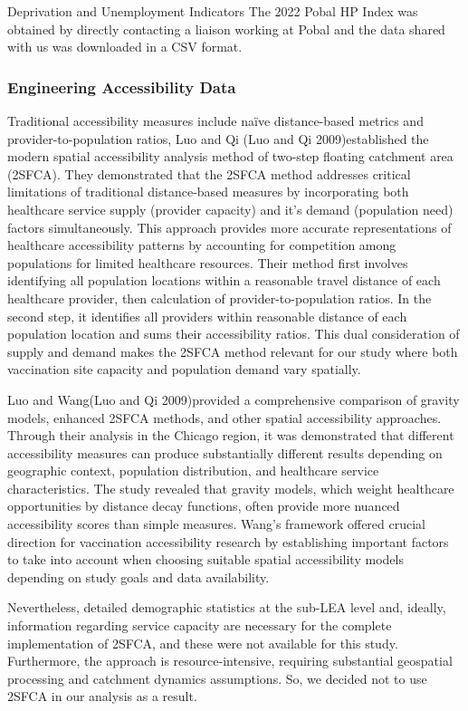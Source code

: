 \documentclass{article}
\begin{document}
Deprivation and Unemployment Indicators The 2022 Pobal HP Index was
obtained by directly contacting a liaison working at Pobal and the data
shared with us was downloaded in a CSV format.

\subsubsection{Engineering Accessibility
Data}\label{engineering-accessibility-data}

Traditional accessibility measures include naïve distance-based metrics
and provider-to-population ratios, Luo and Qi (Luo and Qi
2009)established the modern spatial accessibility analysis method of
two-step floating catchment area (2SFCA). They demonstrated that the
2SFCA method addresses critical limitations of traditional
distance-based measures by incorporating both healthcare service supply
(provider capacity) and it's demand (population need) factors
simultaneously. This approach provides more accurate representations of
healthcare accessibility patterns by accounting for competition among
populations for limited healthcare resources. Their method first
involves identifying all population locations within a reasonable travel
distance of each healthcare provider, then calculation of
provider-to-population ratios. In the second step, it identifies all
providers within reasonable distance of each population location and
sums their accessibility ratios. This dual consideration of supply and
demand makes the 2SFCA method relevant for our study where both
vaccination site capacity and population demand vary spatially.

Luo and Wang(Luo and Qi 2009)provided a comprehensive comparison of
gravity models, enhanced 2SFCA methods, and other spatial accessibility
approaches. Through their analysis in the Chicago region, it was
demonstrated that different accessibility measures can produce
substantially different results depending on geographic context,
population distribution, and healthcare service characteristics. The
study revealed that gravity models, which weight healthcare
opportunities by distance decay functions, often provide more nuanced
accessibility scores than simple measures. Wang's framework offered
crucial direction for vaccination accessibility research by establishing
important factors to take into account when choosing suitable spatial
accessibility models depending on study goals and data availability.

Nevertheless, detailed demographic statistics at the sub-LEA level and,
ideally, information regarding service capacity are necessary for the
complete implementation of 2SFCA, and these were not available for this
study. Furthermore, the approach is resource-intensive, requiring
substantial geospatial processing and catchment dynamics assumptions.
So, we decided not to use 2SFCA in our analysis as a result.
\end{document}
